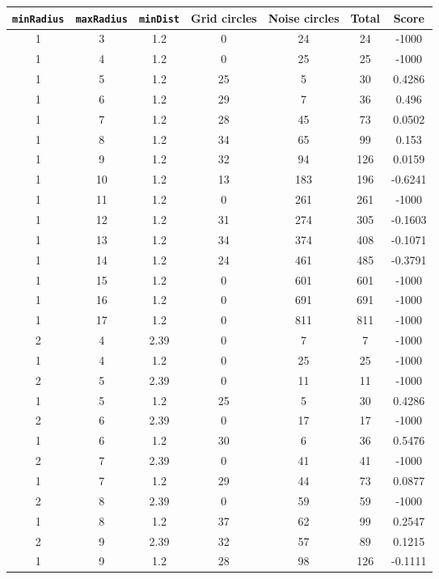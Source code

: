 \documentclass[letterpaper, 12pt]{article}
\begin{document}
\begin{longtable}{|c|c|c|c|c|c|c|}
\hline
\textbf{\texttt{minRadius}} & \textbf{\texttt{maxRadius}} & \textbf{\texttt{minDist}} & \textbf{Grid circles} & \textbf{Noise circles} & \textbf{Total} & \textbf{Score} \\
\hline
1 & 3 & 1.2 & 0 & 24 & 24 & -1000 \\
\hline
1 & 4 & 1.2 & 0 & 25 & 25 & -1000 \\
\hline
1 & 5 & 1.2 & 25 & 5 & 30 & 0.4286 \\
\hline
1 & 6 & 1.2 & 29 & 7 & 36 & 0.496 \\
\hline
1 & 7 & 1.2 & 28 & 45 & 73 & 0.0502 \\
\hline
1 & 8 & 1.2 & 34 & 65 & 99 & 0.153 \\
\hline
1 & 9 & 1.2 & 32 & 94 & 126 & 0.0159 \\
\hline
1 & 10 & 1.2 & 13 & 183 & 196 & -0.6241 \\
\hline
1 & 11 & 1.2 & 0 & 261 & 261 & -1000 \\
\hline
1 & 12 & 1.2 & 31 & 274 & 305 & -0.1603 \\
\hline
1 & 13 & 1.2 & 34 & 374 & 408 & -0.1071 \\
\hline
1 & 14 & 1.2 & 24 & 461 & 485 & -0.3791 \\
\hline
1 & 15 & 1.2 & 0 & 601 & 601 & -1000 \\
\hline
1 & 16 & 1.2 & 0 & 691 & 691 & -1000 \\
\hline
1 & 17 & 1.2 & 0 & 811 & 811 & -1000 \\
\hline
2 & 4 & 2.39 & 0 & 7 & 7 & -1000 \\
\hline
1 & 4 & 1.2 & 0 & 25 & 25 & -1000 \\
\hline
2 & 5 & 2.39 & 0 & 11 & 11 & -1000 \\
\hline
1 & 5 & 1.2 & 25 & 5 & 30 & 0.4286 \\
\hline
2 & 6 & 2.39 & 0 & 17 & 17 & -1000 \\
\hline
1 & 6 & 1.2 & 30 & 6 & 36 & 0.5476 \\
\hline
2 & 7 & 2.39 & 0 & 41 & 41 & -1000 \\
\hline
1 & 7 & 1.2 & 29 & 44 & 73 & 0.0877 \\
\hline
2 & 8 & 2.39 & 0 & 59 & 59 & -1000 \\
\hline
1 & 8 & 1.2 & 37 & 62 & 99 & 0.2547 \\
\hline
2 & 9 & 2.39 & 32 & 57 & 89 & 0.1215 \\
\hline
1 & 9 & 1.2 & 28 & 98 & 126 & -0.1111 \\

\end{longtable}
\end{document}
